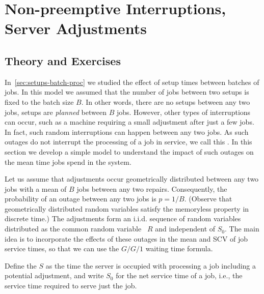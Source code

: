 \section{Non-preemptive Interruptions, Server Adjustments}
\label{sec:non-preempt-interr}

\subsection*{Theory and Exercises}




In~\cref{sec:setups-batch-proc} we studied the effect of setup times between batches of jobs.
In this model we assumed that the number of jobs between two setups is fixed to the batch size $B$.
In other words, there are no setups between any two jobs, setups are \emph{planned} between $B$ jobs.
However, other types of interruptions can occur, such as a machine requiring a small adjustment after just a few jobs.
In fact, such random interruptions can happen between any two jobs.
As such outages do not interrupt the processing of a job in service,  we call this .
In this section we develop a simple model to understand the impact of such outages on the mean time jobs spend in the system.

Let us assume that adjustments occur geometrically distributed between any two jobs with a mean of $B$ jobs between any two repairs.
Consequently, the probability of an outage between any two jobs is $p=1/B$.
(Observe that geometrically distributed random variables satisfy the memoryless property in discrete time.)
The adjustments form an i.i.d.
sequence of random variables distributed as the common random variable ~$R$ and independent of $S_0$.
The main idea is to incorporate the effects of these outages in the mean and SCV of job service times, so that we can use the $G/G/1$ waiting time formula.

Define the  $S$ as the time the server is occupied with processing a job including a potential adjustment, and write $S_0$ for the net service time of a job, i.e., the service time required to serve just the job.

